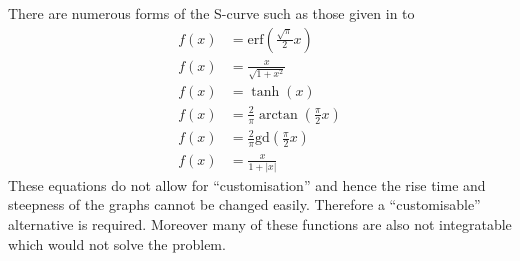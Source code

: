 There are numerous forms of the S-curve such as those given in  to 
\begin{subequations}
    \label{eqn:scurve}
    \begin{align}
        f(x) & = \mathrm{erf} \left ( \frac{\sqrt{\pi}}{2}x \right ) \label{eqn:erf} \\
        f(x) & = \frac{x}{\sqrt{1+x^2}} \label{eqn:sqrt} \\
        f(x) & = \tanh(x) \label{eqn:tanh} \\
        f(x) & = \frac{2}{\pi}\arctan \left ( \frac{\pi}{2}x \right ) \label{eqn:atan} \\
        f(x) & = \frac{2}{\pi}\mathrm{gd} \left ( \frac{\pi}{2}x \right ) \label{eqn:gd} \\
        f(x) & = \frac{x}{1+|x|} \label{eqn:abs}
    \end{align}
\end{subequations}
These equations do not allow for ``customisation'' and hence the rise time and steepness of the graphs cannot be changed easily. Therefore a ``customisable'' alternative is required. Moreover many of these functions are also not integratable which would not solve the problem.

